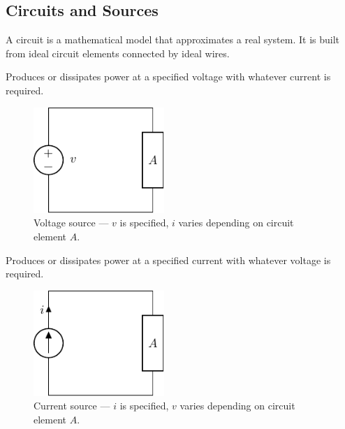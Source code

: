 \documentclass{article}
\begin{document}
\subsection{Circuits and Sources}
\begin{definition}[Circuits]
    A circuit is a mathematical model that approximates a real system. It is built from ideal circuit elements connected by ideal wires.
\end{definition}
\begin{definition}
    Produces or dissipates power at a specified voltage with whatever current is required.
\end{definition}
\begin{figure}[H]
    \centering
    \includegraphics[height = 4cm, keepaspectratio = true]{figures/voltage_source.pdf}
    \caption{Voltage source --- \(v\) is specified, \(i\) varies depending on circuit element \(A\).}
\end{figure}
\begin{definition}
    Produces or dissipates power at a specified current with whatever voltage is required.
\end{definition}
\begin{figure}[H]
    \centering
    \includegraphics[height = 4cm, keepaspectratio = true]{figures/current_source.pdf}
    \caption{Current source --- \(i\) is specified, \(v\) varies depending on circuit element \(A\).}
\end{figure}
\end{document}

